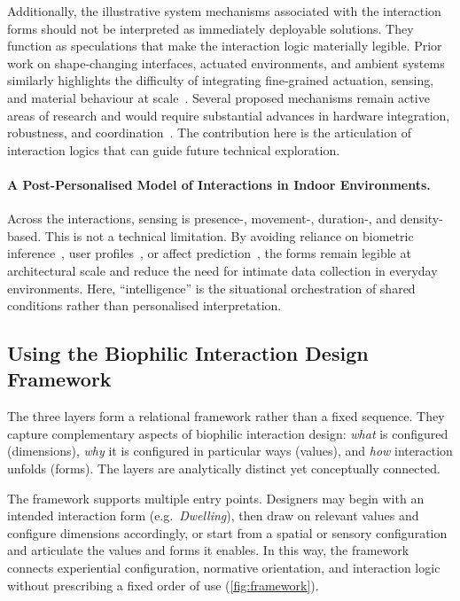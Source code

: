 Additionally, the illustrative system mechanisms associated with the interaction forms should not be interpreted as immediately deployable solutions. They function as speculations that make the interaction logic materially legible. Prior work on shape-changing interfaces, actuated environments, and ambient systems similarly highlights the difficulty of integrating fine-grained actuation, sensing, and material behaviour at scale~\cite{ishii2012radical, follmer2013inform, gaver2013indoor}. Several proposed mechanisms remain active areas of research and would require substantial advances in hardware integration, robustness, and coordination~\cite{lin2025wearable, chhaglani2023breatheasy, weyns2025architectural}. The contribution here is the articulation of interaction logics that can guide future technical exploration.

\paragraph{A Post-Personalised Model of Interactions in Indoor Environments.}
Across the interactions, sensing is presence-, movement-, duration-, and density-based. This is not a technical limitation. By avoiding reliance on biometric inference~\cite{gao2022understanding}, user profiles~\cite{bower2019impact}, or affect prediction~\cite{swaminathan2021tactile}, the forms remain legible at architectural scale and reduce the need for intimate data collection in everyday environments. Here, ``intelligence'' is the situational orchestration of shared conditions rather than personalised interpretation.



\subsection{Using the Biophilic Interaction Design Framework}
\label{subsec:ch5-integration}
The three layers form a relational framework rather than a fixed sequence. They capture complementary aspects of biophilic interaction design: \emph{what} is configured (dimensions), \emph{why} it is configured in particular ways (values), and \emph{how} interaction unfolds (forms). The layers are analytically distinct yet conceptually connected.

The framework supports multiple entry points. Designers may begin with an intended interaction form (e.g.~\emph{Dwelling}), then draw on relevant values and configure dimensions accordingly, or start from a spatial or sensory configuration and articulate the values and forms it enables. In this way, the framework connects experiential configuration, normative orientation, and interaction logic without prescribing a fixed order of use (\autoref{fig:framework}).

